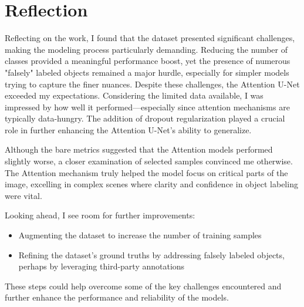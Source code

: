 \chapter{Reflection}

Reflecting on the work, I found that the dataset presented significant challenges, making the modeling process particularly demanding. Reducing the number of classes provided a meaningful performance boost, yet the presence of numerous "falsely" labeled objects remained a major hurdle, especially for simpler models trying to capture the finer nuances. Despite these challenges, the Attention U-Net exceeded my expectations. Considering the limited data available, I was impressed by how well it performed—especially since attention mechanisms are typically data-hungry. The addition of dropout regularization played a crucial role in further enhancing the Attention U-Net's ability to generalize.

Although the bare metrics suggested that the Attention models performed slightly worse, a closer examination of selected samples convinced me otherwise. The Attention mechanism truly helped the model focus on critical parts of the image, excelling in complex scenes where clarity and confidence in object labeling were vital.

Looking ahead, I see room for further improvements:

\begin{itemize}
    \item Augmenting the dataset to increase the number of training samples
    \item Refining the dataset's ground truths by addressing falsely labeled objects, perhaps by leveraging third-party annotations
\end{itemize}

These steps could help overcome some of the key challenges encountered and further enhance the performance and reliability of the models.